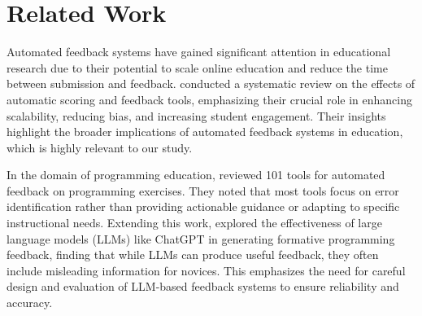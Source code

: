 \documentclass[manuscript,screen,review]{acmart}
\begin{document}
\section{Related Work} %
\label{sec:related-work}

Automated feedback systems have gained significant attention in educational research due to their potential to scale online education and reduce the time between submission and feedback. \citet{hahn:2021:SystematicReviewEffects} conducted a systematic review on the effects of automatic scoring and feedback tools, emphasizing their crucial role in enhancing scalability, reducing bias, and increasing student engagement. Their insights highlight the broader implications of automated feedback systems in education, which is highly relevant to our study.


%
In the domain of programming education, \citet{keuning:2018:SystematicLiteratureReview} reviewed 101 tools for automated feedback on programming exercises. They noted that most tools focus on error identification rather than providing actionable guidance or adapting to specific instructional needs. Extending this work, \citet{kiesler:2023:ExploringPotentialLarge} explored the effectiveness of large language models (LLMs) like ChatGPT in generating formative programming feedback, finding that while LLMs can produce useful feedback, they often include misleading information for novices. This emphasizes the need for careful design and evaluation of LLM-based feedback systems to ensure reliability and accuracy.
\end{document}
